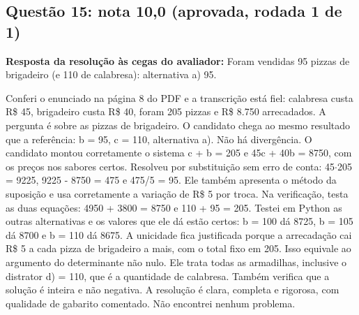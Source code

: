 \documentclass{article}%
\begin{document}
\subsection*{Questão 15: nota 10,0 (aprovada, rodada 1 de 1)}%
\textbf{Resposta da resolução às cegas do avaliador:} Foram vendidas 95 pizzas de brigadeiro (e 110 de calabresa): alternativa a) 95.\par %
Conferi o enunciado na página 8 do PDF e a transcrição está fiel: calabresa custa R\$ 45, brigadeiro custa R\$ 40, foram 205 pizzas e R\$ 8.750 arrecadados. A pergunta é sobre as pizzas de brigadeiro.\newline%
\newline%
O candidato chega ao mesmo resultado que a referência: b = 95, c = 110, alternativa a). Não há divergência.\newline%
\newline%
O candidato montou corretamente o sistema c + b = 205 e 45c + 40b = 8750, com os preços nos sabores certos. Resolveu por substituição sem erro de conta: 45$\cdot$205 = 9225, 9225 - 8750 = 475 e 475/5 = 95.\newline%
\newline%
Ele também apresenta o método da suposição e usa corretamente a variação de R\$ 5 por troca. Na verificação, testa as duas equações: 4950 + 3800 = 8750 e 110 + 95 = 205.\newline%
\newline%
Testei em Python as outras alternativas e os valores que ele dá estão certos: b = 100 dá 8725, b = 105 dá 8700 e b = 110 dá 8675.\newline%
\newline%
A unicidade fica justificada porque a arrecadação cai R\$ 5 a cada pizza de brigadeiro a mais, com o total fixo em 205. Isso equivale ao argumento do determinante não nulo.\newline%
\newline%
Ele trata todas as armadilhas, inclusive o distrator d) = 110, que é a quantidade de calabresa. Também verifica que a solução é inteira e não negativa.\newline%
\newline%
A resolução é clara, completa e rigorosa, com qualidade de gabarito comentado. Não encontrei nenhum problema.%
\end{document}
